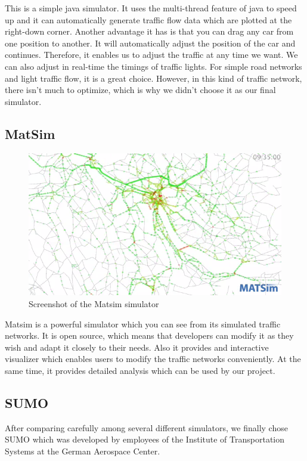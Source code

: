 \documentclass{article} %
\begin{document}
This is a simple java simulator. It uses the multi-thread feature of java to speed up and it can automatically generate traffic flow data which are plotted at the right-down corner. Another advantage it has is that you can drag any car from one position to another. It will automatically adjust the position of the car and continues. Therefore, it enables us to adjust the traffic at any time we want. We can also adjust in real-time the timings of traffic lights. For simple road networks and light traffic flow, it is a great choice. However, in this kind of traffic network, there isn't much to optimize, which is why we didn't choose it as our final simulator. 

\subsection{MatSim}
\begin{figure}[]
\caption{Screenshot of the Matsim simulator}
 \includegraphics[width=\textwidth]{images/matsim_zurich.png}
\end{figure}

Matsim is a powerful simulator which you can see from its simulated traffic networks. 
It is open source, which means that developers can modify it as they wish and adapt it closely to their needs. Also it provides and interactive visualizer which enables users to modify the traffic networks conveniently. At the same time, it provides detailed analysis which can be used by our project.

\subsection{SUMO}
After comparing carefully among several different simulators, we finally chose SUMO which was developed by employees of the Institute of Transportation Systems at the German Aerospace Center.
\end{document}
